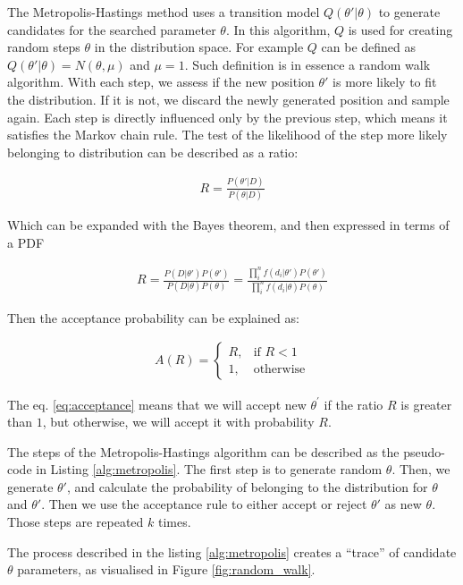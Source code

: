 The Metropolis-Hastings method uses a transition model $Q(\theta'|\theta)$ to generate candidates for the searched parameter $\theta$.
In this algorithm, $Q$ is used for creating random steps $\theta$ in the distribution space.
For example $Q$ can be defined as $Q(\theta'|\theta)=N(\theta, \mu)$ and $\mu=1$. Such definition is in essence a random walk algorithm.
With each step, we assess if the new position $\theta'$ is more likely to fit the distribution.
If it is not, we discard the newly generated position and sample again.
Each step is directly influenced only by the previous step, which means it satisfies the Markov chain rule.
The test of the likelihood of the step more likely belonging to distribution can be described as a ratio:

\begin{align}
  R = \frac{P(\theta'|D)}{P(\theta|D)}
\end{align}

Which can be expanded with the Bayes theorem, and then expressed in terms of a PDF

\begin{align}
  R = \frac{P(D|\theta')P(\theta')}{P(D|\theta)P(\theta)} =\frac{ \prod_{i}^{n}f(d_{i}|\theta')P(\theta') }{\prod_{i}^{n}f(d_{i}|\theta)P(\theta)}
\end{align}

Then the acceptance probability can be explained as:

\begin{align}
    A(R)=
\begin{cases}
    R, & \text{if } R < 1 \\
    1,& \text{otherwise}
\end{cases}
      \label{eq:acceptance}
\end{align}

The eq. \ref{eq:acceptance} means that we will accept new $\theta^{\prime}$ if the ratio $R$ is greater than $1$, but otherwise, we will accept it with probability $R$.

The steps of the Metropolis-Hastings algorithm can be described as the pseudo-code in Listing \ref{alg:metropolis}.
The first step is to generate random $\theta$. Then, we generate $\theta\prime$, and calculate the probability of belonging to the distribution for $\theta$ and $\theta\prime$. Then we use the acceptance rule to either accept or reject $\theta\prime$ as new $\theta$. Those steps are repeated $k$ times.

The process described in the listing \ref{alg:metropolis} creates a ``trace'' of candidate $\theta$ parameters, as visualised in Figure \ref{fig:random_walk}.

